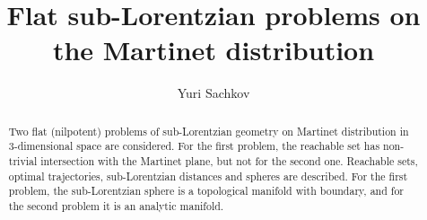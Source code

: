 \begin{englishtitle} %
\title{Flat sub-Lorentzian problems on the Martinet distribution}
\author{Yuri Sachkov
}
\maketitle

\begin{abstract}
Two flat (nilpotent) problems of sub-Lorentzian geometry on
Martinet distribution in 3-dimensional space are considered. For the first problem, the reachable set has
non-trivial intersection with the Martinet plane, but not for the second one.
Reachable sets, optimal trajectories, sub-Lorentzian
distances and spheres are described. For the first problem, the sub-Lorentzian sphere is a topological
manifold with boundary, and for the second problem it is an analytic manifold.

\end{abstract}
\end{englishtitle}


\iffalse
%
%


\documentclass[12pt]{llncs}  


\usepackage{iftex}


\ifPDFTeX
\usepackage[T2A]{fontenc}
\usepackage[utf8]{inputenc} %
\usepackage[english,russian]{babel}
\fi

\usepackage{todonotes} 

\usepackage[russian]{nla}


\fi

